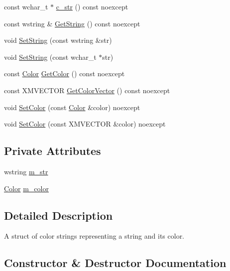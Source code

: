 \begin{DoxyCompactItemize}
\item 
const wchar\+\_\+t $\ast$ \hyperlink{structmage_1_1_color_string_af2241b81cac59051e9ebf0ddefe719ed}{c\+\_\+str} () const noexcept
\item 
const wstring \& \hyperlink{structmage_1_1_color_string_aee22268a2fe552320299dfa5ac5a93e1}{Get\+String} () const noexcept
\item 
void \hyperlink{structmage_1_1_color_string_aa5ec8bb8e44683ed8a88534f04639930}{Set\+String} (const wstring \&str)
\item 
void \hyperlink{structmage_1_1_color_string_a317caadad725b67ede68f1e474e47d3b}{Set\+String} (const wchar\+\_\+t $\ast$str)
\item 
const \hyperlink{structmage_1_1_color}{Color} \hyperlink{structmage_1_1_color_string_afba86162d9c13d76dcdb9cf232e8e89f}{Get\+Color} () const noexcept
\item 
const X\+M\+V\+E\+C\+T\+OR \hyperlink{structmage_1_1_color_string_a9326950147ecdc3c09909518e0dddb76}{Get\+Color\+Vector} () const noexcept
\item 
void \hyperlink{structmage_1_1_color_string_acff8b67574e427674e6abb98da7cca3a}{Set\+Color} (const \hyperlink{structmage_1_1_color}{Color} \&color) noexcept
\item 
void \hyperlink{structmage_1_1_color_string_a298a253ed03e92f4c083b65af9c7dc06}{Set\+Color} (const X\+M\+V\+E\+C\+T\+OR \&color) noexcept
\end{DoxyCompactItemize}
\subsection*{Private Attributes}
\begin{DoxyCompactItemize}
\item 
wstring \hyperlink{structmage_1_1_color_string_a9eb840afa5112cd611f5bb1b21edc045}{m\+\_\+str}
\item 
\hyperlink{structmage_1_1_color}{Color} \hyperlink{structmage_1_1_color_string_a3f351c61281fc49786bc13842527d2a3}{m\+\_\+color}
\end{DoxyCompactItemize}


\subsection{Detailed Description}
A struct of color strings representing a string and its color. 

\subsection{Constructor \& Destructor Documentation}
\hypertarget{structmage_1_1_color_string_a9737fbe265c4432971e715439827f25a}{}\label{structmage_1_1_color_string_a9737fbe265c4432971e715439827f25a} 
